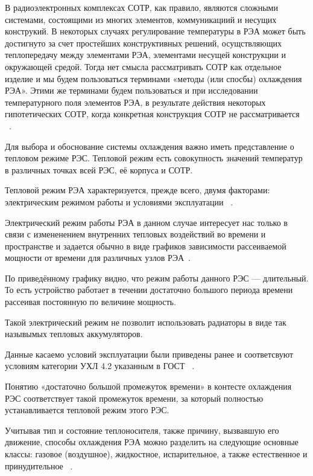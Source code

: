 В радиоэлектронных комплексах СОТР, как правило, являются сложными
системами, состоящими из многих элементов, коммуникациий и несущих
конструкий. В некоторых случаях регулирование температуры в РЭА может
быть достигнуто за счет простейших конструктивных решений,
осущствляющих теплопередачу между элементами РЭА, элементами несущей
конструкции и окружающей средой. Тогда нет смысла рассматривать СОТР
как отдельное изделие и мы будем пользоваться терминами «методы (или
спосбы) охлаждения РЭА». Этими же терминами будем пользоваться и при
исследовании температурного поля элементов РЭА, в результате действия
некоторых гипотетических СОТР, когда конкретная конструкция СОТР не
рассматривается ~\cite{Rotkop1976}.

Для выбора и обоснование системы охлаждения важно иметь представление
о тепловом режиме РЭС.  Тепловой режим есть совокупность значений
температур в различных точках всей РЭС, её корпуса и СОТР.

Тепловой режим РЭА характеризуется, прежде всего, двумя факторами:
электрическим режимом работы и условиями эксплуатации ~\cite{Rotkop1976}.

Электрический режим работы РЭА в данном случае интересует нас только в
связи с измененением внутренних тепловых воздействий во времени и
пространстве и задается обычно в виде графиков зависимости
рассеиваемой мощности от времени для различных узлов РЭА~\cite{Rotkop1976}.



По приведённому графику видно, что режим работы данного РЭС —
длительный. То есть устройство работает в течении достаточно большого
периода времени рассеивая постоянную по величине мощность.

Такой электрический режим не позволит использовать радиаторы в виде
так назывымых тепловых аккумуляторов.

Данные касаемо условий эксплуатации были приведены ранее и
соответсвуют условиям категории УХЛ 4.2 указанным в ГОСТ
~\cite{GOST_15150-69}.

Понятию «достаточно большой промежуток времени» в контесте охлаждения
РЭС соответствует такой промежуток времени, за который полностью
устанавливается тепловой режим этого РЭС.

Учитывая тип и состояние теплоносителя, также причину, вызвавшую его
движение, способы охлаждения РЭА можно разделить на следующие основные
классы: газовое (воздушное), жидкостное, испарительное, а также
естественное и принудительное ~\cite{Rotkop1976}.

